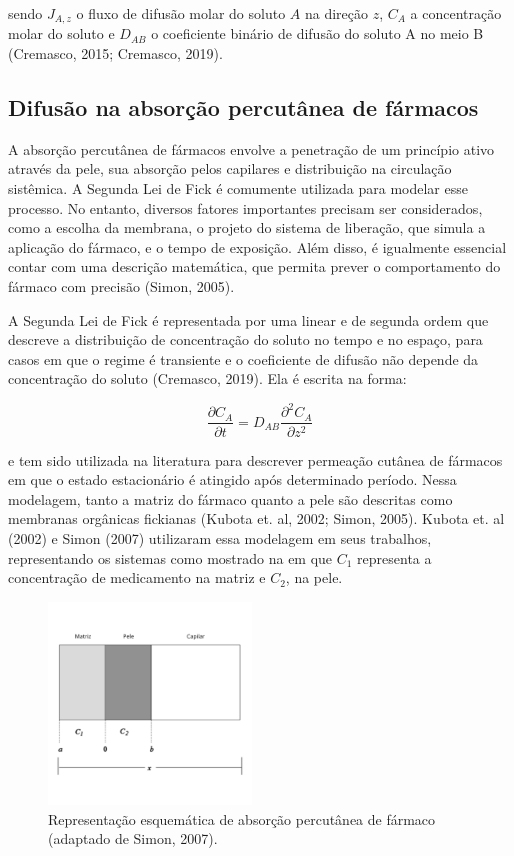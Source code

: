 \noindent sendo $J_{A,z}$ o fluxo de difusão molar do soluto $A$ na direção $z$, $C_A$ a concentração molar do soluto e $D_{AB}$ o coeficiente binário de difusão do soluto A no meio B (Cremasco, 2015; Cremasco, 2019).

\subsection{Difusão na absorção percutânea de fármacos}

A absorção percutânea de fármacos envolve a penetração de um princípio ativo através da pele, sua absorção pelos capilares e distribuição na circulação sistêmica. A Segunda Lei de Fick é comumente utilizada para modelar esse processo. No entanto, diversos fatores importantes precisam ser considerados, como a escolha da membrana, o projeto do sistema de liberação, que simula a aplicação do fármaco, e o tempo de exposição. Além disso, é igualmente essencial contar com uma descrição matemática, que permita prever o comportamento do fármaco com precisão (Simon, 2005).

A Segunda Lei de Fick é representada por uma  linear e de segunda ordem que descreve a distribuição de concentração do soluto no tempo e no espaço, para casos em que o regime é transiente e o coeficiente de difusão não depende da concentração do soluto (Cremasco, 2019). Ela é escrita na forma:

\begin{equation}
\frac{\partial C_A}{\partial t} = D_{AB} \frac{\partial^2 C_A}{\partial z^2}
\end{equation}

\noindent e tem sido utilizada na literatura para descrever permeação cutânea de fármacos em que o estado estacionário é atingido após determinado período. Nessa modelagem, tanto a matriz do fármaco quanto a pele são descritas como membranas orgânicas fickianas (Kubota et. al, 2002; Simon, 2005). Kubota et. al (2002) e Simon (2007) utilizaram essa modelagem em seus trabalhos, representando os sistemas como mostrado na  em que $C_1$ representa a concentração de medicamento na matriz e $C_2$, na pele.

\begin{figure}[!htb]
    \centering
        \includegraphics[width=0.48\textwidth]{figuras/modelo_adesivo.png}
        \caption[Representação esquemática de absorção percutânea]{Representação esquemática de absorção percutânea de fármaco (adaptado de Simon, 2007). }
    \label{fig:modelo_adesivo}
\end{figure}

